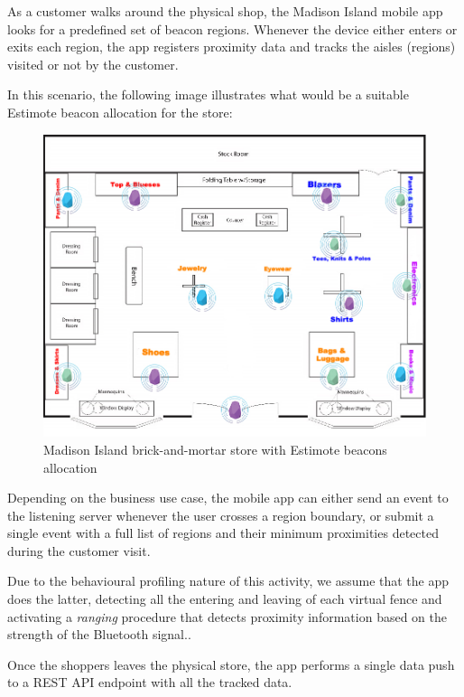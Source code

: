 As a customer walks around the physical shop, the Madison Island mobile app looks for a predefined set of beacon regions. Whenever the device either enters or exits each region, the app registers proximity data and tracks the aisles (regions) visited or not by the customer.

In this scenario, the following image illustrates what would be a suitable Estimote beacon allocation for the store:

\vspace{0.5cm}
\begin{figure}[H]
  \centering
    \includegraphics[width=14cm]{images/madison/retail-map-beacon.jpg}
  \caption{Madison Island brick-and-mortar store with Estimote beacons allocation}
  \label{fig:beacons-map}
\end{figure}
\vspace{0.5cm}

Depending on the business use case, the mobile app can either send an event to the listening server whenever the user crosses a region boundary, or submit a single event with a full list of regions and their minimum proximities detected during the customer visit. 

Due to the behavioural profiling nature of this activity, we assume that the app does the latter, detecting all the entering and leaving of each virtual fence and activating a \textit{ranging} procedure that detects proximity information based on the strength of the Bluetooth signal.\cite{region-monitoring-apple}.

Once the shoppers leaves the physical store, the app performs a single data push to a REST API endpoint with all the tracked data.

